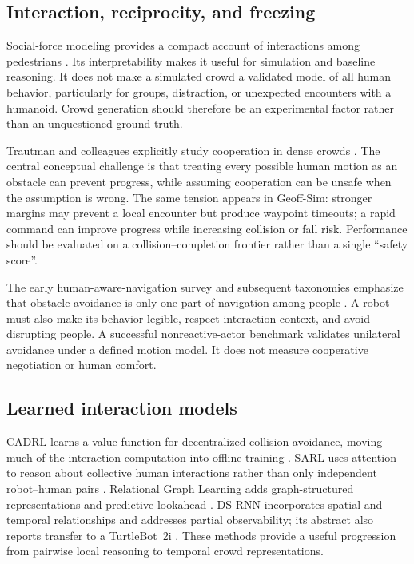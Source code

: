 \documentclass[11pt,a4paper]{article}
\begin{document}
\subsection{Interaction, reciprocity, and freezing}
Social-force modeling provides a compact account of interactions among
pedestrians \citep{socialforce}. Its interpretability makes it useful for
simulation and baseline reasoning. It does not make a simulated crowd a
validated model of all human behavior, particularly for groups, distraction,
or unexpected encounters with a humanoid. Crowd generation should therefore
be an experimental factor rather than an unquestioned ground truth.

Trautman and colleagues explicitly study cooperation in dense crowds
\citep{freezing}. The central conceptual challenge is that treating every
possible human motion as an obstacle can prevent progress, while assuming
cooperation can be unsafe when the assumption is wrong. The same tension
appears in Geoff-Sim: stronger margins may prevent a local encounter but
produce waypoint timeouts; a rapid command can improve progress while
increasing collision or fall risk. Performance should be evaluated on a
collision--completion frontier rather than a single ``safety score''.

The early human-aware-navigation survey and subsequent taxonomies emphasize
that obstacle avoidance is only one part of navigation among people
\citep{survey2013,survey2024}. A robot must also make its behavior legible,
respect interaction context, and avoid disrupting people. A successful
nonreactive-actor benchmark validates unilateral avoidance under a defined
motion model. It does not measure cooperative negotiation or human comfort.

\subsection{Learned interaction models}
CADRL learns a value function for decentralized collision avoidance, moving
much of the interaction computation into offline training \citep{cadrl}.
SARL uses attention to reason about collective human interactions rather
than only independent robot--human pairs \citep{sarl}. Relational Graph
Learning adds graph-structured representations and predictive lookahead
\citep{rgl}. DS-RNN incorporates spatial and temporal relationships and
addresses partial observability; its abstract also reports transfer to a
TurtleBot~2i \citep{dsrnn}. These methods provide a useful progression from
pairwise local reasoning to temporal crowd representations.
\end{document}
